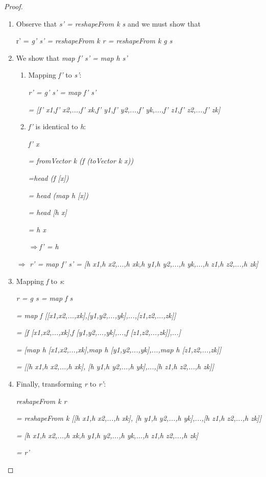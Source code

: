 \documentclass{article}
\begin{document}
\begin{proof}

~
\begin{enumerate}
\item Observe that \emph{s' = reshapeFrom k s} and we must show that 


r' = \emph{g' s' = reshapeFrom k r = reshapeFrom k g s}

\item We show that \emph{map f' s' = map h s'}

\begin{enumerate}
\item Mapping \emph{f'} to \emph{s'}:


\emph{r' = g' s' = map f' s'}


\emph{= {[}f' x1,f' x2,...,f' xk,f' y1,f' y2,...,f' yk,...,f' z1,f'
z2,...,f' zk{]}}

\item \emph{f'} is identical to \emph{h}:


\emph{f' x}


\emph{= fromVector k (f (toVector k x))}


\emph{=head (f {[}x{]})}


\emph{= head (map h {[}x{]})}


\emph{= head {[}h x{]}}


\emph{= h x}


$\Rightarrow$\emph{f' = h}

\end{enumerate}

$\Rightarrow$\emph{ r' = map f' s' = {[}h x1,h x2,...,h xk,h y1,h
y2,...,h yk,...,h z1,h z2,...,h zk{]}}

\item Mapping \emph{f} to \emph{s}:


\emph{r = g s = map f s }


\emph{= map f {[}{[}x1,x2,...,xk{]},{[}y1,y2,...,yk{]},...,{[}z1,z2,...,zk{]}{]}}


\emph{= {[}f {[}x1,x2,...,xk{]},f {[}y1,y2,...,yk{]},...,f {[}z1,z2,...,zk{]}{]},...{]}}


\emph{= {[}map h {[}x1,x2,...,xk{]},map h {[}y1,y2,...,yk{]},...,map
h {[}z1,z2,...,zk{]}{]}}


\emph{= {[}{[}h x1,h x2,...,h xk{]}, {[}h y1,h y2,...,h yk{]},...,{[}h
z1,h z2,...,h zk{]}{]}}

\item Finally, transforming \emph{r} to \emph{r'}:


\emph{reshapeFrom k r }


\emph{= reshapeFrom k {[}{[}h x1,h x2,...,h xk{]}, {[}h y1,h y2,...,h
yk{]},...,{[}h z1,h z2,...,h zk{]}{]} }


\emph{= {[}h x1,h x2,...,h xk,h y1,h y2,...,h yk,...,h z1,h z2,...,h
zk{]} }


\emph{= r'}

\end{enumerate}
\end{proof}
\end{document}
